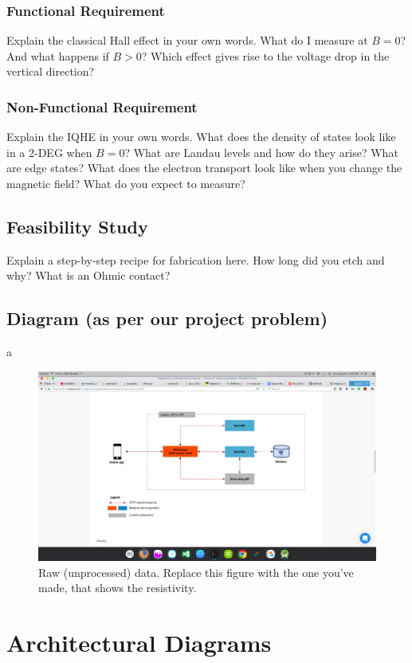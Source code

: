 \documentclass[a4paper]{report}
\begin{document}
    \subsection{Functional Requirement}
    Explain the classical Hall effect in your own words. What do I measure at $B=0$? And what happens if $B>0$? Which effect gives rise to the voltage drop in the vertical direction?
    \subsection{Non-Functional Requirement}
    Explain the IQHE in your own words. What does the density of states look like in a 2-DEG when $B=0$? What are Landau levels and how do they arise? What are edge states? What does the electron transport look like when you change the magnetic field? What do you expect to measure?    
    \section{Feasibility Study}    
    Explain a step-by-step recipe for fabrication here. How long did you etch and why? What is an Ohmic contact?
    \section{Diagram (as per our project problem)}
    a
    \begin{figure}
    \centering
    \includegraphics[width=1\textwidth]{test.png}
    \caption{\label{fig:data}Raw (unprocessed) data. Replace this figure with the one you've made, that shows the resistivity.}
    \end{figure}    
    
    \chapter {Architectural Diagrams}
\end{document}
